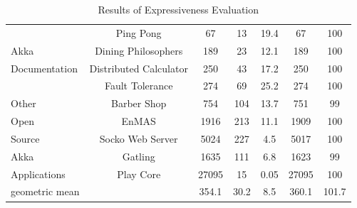 \begin{table}[!ht]
\begin{center}
\begin{tabular}{| m{2.3 cm} | c | c | c |  c | c | c |}
                                                               & Ping Pong & 67
& 13 & 19.4 & 67 & 100 \\
\cline{2-7}
Akka                 & Dining Philosophers & 189 & 23 & 12.1 &
189 & 100  \\
\cline{2-7}
Documentation             & Distributed Calculator  & 250 &
43 & 17.2 & 250 & 100 \\
\cline{2-7}
\cite{akka_doc}                                                     & Fault Tolerance & 274 &
69 & 25.2 & 274 & 100 \\
\hline

Other                                                   & Barber Shop 
\cite{BarberShop}& 754 & 104 & 
13.7 & 751 & 99 \\
\cline{2-7}
Open              & EnMAS \cite{EnMAS} & 1916 & 213 & 11.1 & 1909 &
100 \\
\cline{2-7}
Source                 & Socko Web Server \cite{SOCKO}  & 5024 & 
227
& 4.5 & 5017 & 100 \\
\cline{2-7}
 Akka                                                     & Gatling \cite{Gatling}
& 1635 & 111 & 6.8 & 1623 & 99 \\
\cline{2-7}
 Applications                                                      & Play Core 
\cite{play_doc}
& 27095 & 15 & 0.05 & 27095 & 100 \\
\hline
geometric mean                   & & 354.1 & 30.2 & 8.5 & 360.1 & 101.7 \\
\hline
\end{tabular}
\caption{Results of Expressiveness Evaluation}
\end{center}
\label{express}
\end{table}


